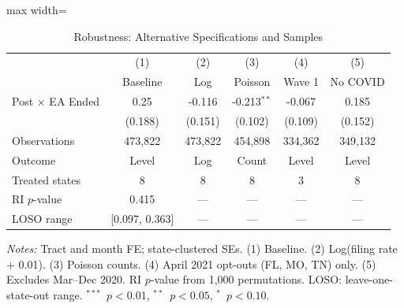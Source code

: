 \begin{table}[htbp]
\centering
\caption{Robustness: Alternative Specifications and Samples}
\label{tab:robust}
\begin{adjustbox}{max width=\textwidth}
\begin{tabular}{lccccc}
\toprule
 & (1) & (2) & (3) & (4) & (5) \\
 & Baseline & Log & Poisson & Wave 1 & No COVID \\
\midrule
Post $\times$ EA Ended & 0.25 & -0.116 & -0.213$^{**}$ & -0.067 & 0.185 \\
 & (0.188) & (0.151) & (0.102) & (0.109) & (0.152) \\
\midrule
Observations & 473,822 & 473,822 & 454,898 & 334,362 & 349,132 \\
Outcome & Level & Log & Count & Level & Level \\
Treated states & 8 & 8 & 8 & 3 & 8 \\
RI $p$-value & 0.415 & --- & --- & --- & --- \\
LOSO range & [0.097, 0.363] & --- & --- & --- & --- \\
\bottomrule
\end{tabular}
\end{adjustbox}
\begin{tablenotes}
\small
\item \textit{Notes:} Tract and month FE; state-clustered SEs. (1) Baseline. (2) Log(filing rate + 0.01). (3) Poisson counts. (4) April 2021 opt-outs (FL, MO, TN) only. (5) Excludes Mar--Dec 2020. RI $p$-value from 1,000 permutations. LOSO: leave-one-state-out range. $^{***}$~$p<0.01$, $^{**}$~$p<0.05$, $^{*}$~$p<0.10$.
\end{tablenotes}
\end{table}

